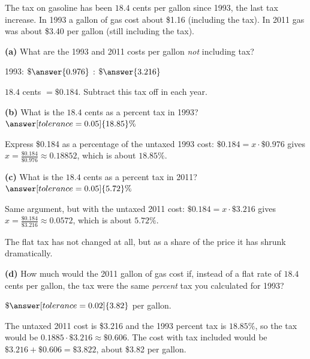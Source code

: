 \documentclass[12pt]{ximera}
\begin{document}
\begin{problem}
The tax on gasoline has been $18.4$ cents per gallon since 1993, the last tax
increase. In 1993 a gallon of gas cost about \$1.16 (including the tax). In 2011 gas
was about \$3.40 per gallon (still including the tax).

\begin{prompt}
\textbf{(a)} What are the 1993 and 2011 costs per gallon \emph{not} including tax?

1993: $\$\answer{0.976}$ : $\$\answer{3.216}$

\begin{hint}
$18.4$ cents $= \$0.184$. Subtract this tax off in each year.
\end{hint}
\end{prompt}

\begin{prompt}
\textbf{(b)} What is the $18.4$ cents as a percent tax in 1993?
$\answer[tolerance=0.05]{18.85}\%$

\begin{solution}
Express \$0.184 as a percentage of the untaxed 1993 cost:
$\$0.184 = x \cdot \$0.976$ gives $x = \frac{\$0.184}{\$0.976} \approx 0.18852$,
which is about $18.85\%$.
\end{solution}
\end{prompt}

\begin{prompt}
\textbf{(c)} What is the $18.4$ cents as a percent tax in 2011?
$\answer[tolerance=0.05]{5.72}\%$

\begin{solution}
Same argument, but with the untaxed 2011 cost:
$\$0.184 = x \cdot \$3.216$ gives $x = \frac{\$0.184}{\$3.216} \approx 0.0572$,
which is about $5.72\%$.

The flat tax has not changed at all, but as a share of the price it has shrunk
dramatically.
\end{solution}
\end{prompt}

\begin{prompt}
\textbf{(d)} How much would the 2011 gallon of gas cost if, instead of a flat rate of
$18.4$ cents per gallon, the tax were the same \emph{percent} tax you calculated for
1993?

$\$\answer[tolerance=0.02]{3.82}$ per gallon.

\begin{solution}
The untaxed 2011 cost is \$3.216 and the 1993 percent tax is $18.85\%$, so the tax
would be $0.1885 \cdot \$3.216 \approx \$0.606$. The cost with tax included would be
$\$3.216 + \$0.606 = \$3.822$, about \$3.82 per gallon.
\end{solution}
\end{prompt}


\end{problem}
\end{document}
